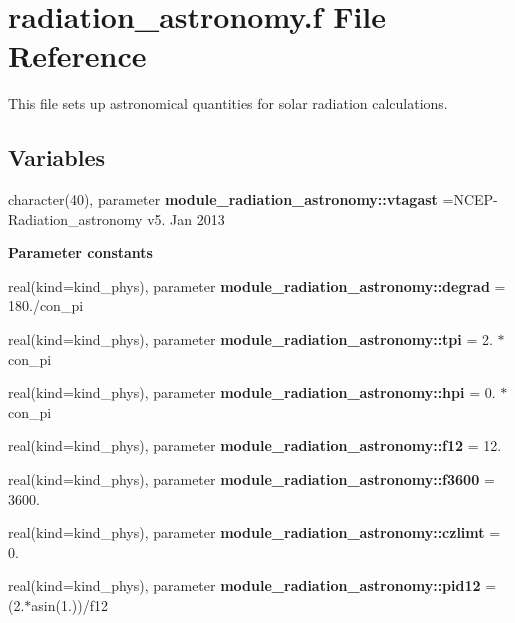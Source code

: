 \hypertarget{radiation__astronomy_8f}{}\section{radiation\+\_\+astronomy.\+f File Reference}
\label{radiation__astronomy_8f}


This file sets up astronomical quantities for solar radiation calculations.  


\subsection*{Variables}
\begin{DoxyCompactItemize}
\item 
\mbox{\label{radiation__astronomy_8f_aa3497dc9fa4bbd8248fdf0f2784c268a}} 
character(40), parameter {\bfseries module\+\_\+radiation\+\_\+astronomy\+::vtagast} =\textquotesingle{}N\+C\+EP-\/Radiation\+\_\+astronomy v5. Jan 2013 \textquotesingle{}
\end{DoxyCompactItemize}
\begin{Indent}\textbf{ Parameter constants}\par
\begin{DoxyCompactItemize}
\item 
real(kind=kind\+\_\+phys), parameter {\bfseries module\+\_\+radiation\+\_\+astronomy\+::degrad} = 180./con\+\_\+pi
\item 
real(kind=kind\+\_\+phys), parameter {\bfseries module\+\_\+radiation\+\_\+astronomy\+::tpi} = 2. $\ast$ con\+\_\+pi
\item 
real(kind=kind\+\_\+phys), parameter {\bfseries module\+\_\+radiation\+\_\+astronomy\+::hpi} = 0. $\ast$ con\+\_\+pi
\item 
real(kind=kind\+\_\+phys), parameter {\bfseries module\+\_\+radiation\+\_\+astronomy\+::f12} = 12.
\item 
real(kind=kind\+\_\+phys), parameter {\bfseries module\+\_\+radiation\+\_\+astronomy\+::f3600} = 3600.
\item 
real(kind=kind\+\_\+phys), parameter {\bfseries module\+\_\+radiation\+\_\+astronomy\+::czlimt} = 0.
\item 
real(kind=kind\+\_\+phys), parameter {\bfseries module\+\_\+radiation\+\_\+astronomy\+::pid12} = (2.$\ast$asin(1.))/f12
\end{DoxyCompactItemize}
\end{Indent}
